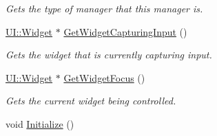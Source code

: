 \begin{DoxyCompactItemize}
\begin{DoxyCompactList}\small\item\em Gets the type of manager that this manager is. \item\end{DoxyCompactList}\item 
\hyperlink{classMezzanine_1_1UI_1_1Widget}{UI::Widget} $\ast$ \hyperlink{classMezzanine_1_1UIManager_ac4fda10f2f5af5df7ecbc089eb1ee359}{GetWidgetCapturingInput} ()
\begin{DoxyCompactList}\small\item\em Gets the widget that is currently capturing input. \item\end{DoxyCompactList}\item 
\hyperlink{classMezzanine_1_1UI_1_1Widget}{UI::Widget} $\ast$ \hyperlink{classMezzanine_1_1UIManager_a57b306a3fca917e2dfa1c05ca87f6262}{GetWidgetFocus} ()
\begin{DoxyCompactList}\small\item\em Gets the current widget being controlled. \item\end{DoxyCompactList}\item 
\hypertarget{classMezzanine_1_1UIManager_a51dc53c08ac8657133279e75fbce466a}{
void \hyperlink{classMezzanine_1_1UIManager_a51dc53c08ac8657133279e75fbce466a}{Initialize} ()}
\label{classMezzanine_1_1UIManager_a51dc53c08ac8657133279e75fbce466a}


\end{DoxyCompactItemize}
